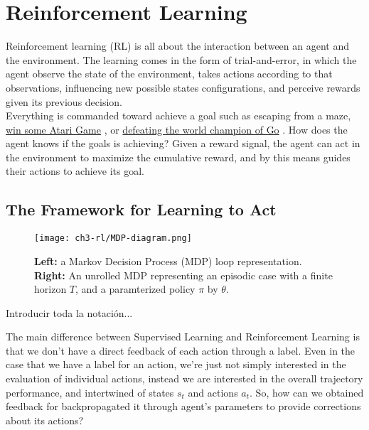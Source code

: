 \chapter{Reinforcement Learning}

Reinforcement learning (RL) is all about the interaction between an agent and the environment. The learning comes in the form of trial-and-error, in which the agent observe the state of the environment, takes actions according to that observations, influencing new possible states configurations, and perceive rewards given its previous decision. \\
Everything is commanded toward achieve a goal such as escaping from a maze, \href{https://arxiv.org/abs/1312.5602}{win some Atari Game} \citep{mnih2013playing}, or \href{https://deepmind.google/technologies/alphago/}{defeating the world champion of Go} \citep{silver2016mastering}. How does
the agent knows if the goals is achieving? Given a reward signal, the
agent can act in the environment to maximize the cumulative reward, and
by this means guides their actions to achieve its goal.



\section{The Framework for Learning to Act}

\begin{figure}[ht]
    \centering
    \texttt{[image: ch3-rl/MDP-diagram.png]}
    \captionsetup{width=\textwidth} %
    \caption{\textbf{Left:} a Markov Decision Process (MDP) loop representation. \textbf{Right:} An unrolled MDP representing an episodic case with a finite horizon $T$, and a paramterized policy $\pi$ by $\theta$.}
    \label{fig:mdp-diagram}
  \end{figure}

Introducir toda la notación...


The main difference between Supervised Learning and Reinforcement Learning is that we don't have a direct feedback of each action through a label. Even in the case that we have a label for an action, we're just not simply interested in the evaluation of individual actions, instead we are interested in the overall trajectory performance, and intertwined of states $s_t$ and actions $a_t$. So, how can we obtained feedback for backpropagated it through agent's parameters to provide corrections about its actions?

